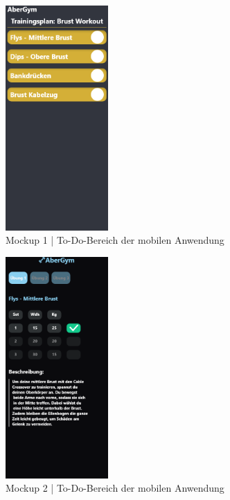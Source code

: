 \begin{figure}[!htb]
    \centering
    \includegraphics[width=0.35\textwidth]{pics/todolist1.png}
    \caption{Mockup 1 | To-Do-Bereich der mobilen Anwendung}
    \label{fig:todolist1}
\end{figure}
\begin{figure}[!htb]
    \centering
    \includegraphics[width=0.35\textwidth]{pics/todolist2.png}
    \caption{Mockup 2 | To-Do-Bereich der mobilen Anwendung}
    \label{fig:todolist2}
\end{figure}
